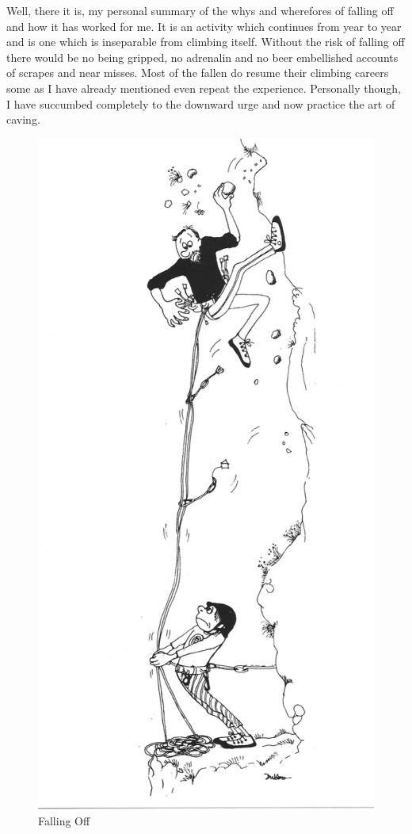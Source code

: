 \documentclass[a5paper,openany,font 10pt]{scrbook}
\begin{document}
Well, there it is, my personal summary of the whys and
wherefores of falling off and how it has worked for me. It is an
activity which continues from year to year and is one which is
inseparable from climbing itself. Without the risk of falling off
there would be no being gripped, no adrenalin and no beer embellished
accounts of scrapes and near misses. Most of the
fallen do resume their climbing careers  some  as I have already
mentioned  even repeat the experience. Personally though, I have
succumbed completely to the downward urge and now practice the
art of caving.
\begin{figure}[htb]
\centering
\includegraphics[width=.9\linewidth]{./images/Cartoon_08.jpg}
\caption{\label{fig:org494040a}
Falling Off}
\end{figure}
\end{document}
